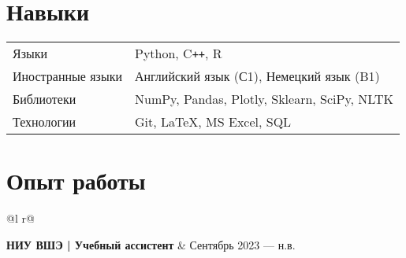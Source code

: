 \documentclass[a4paper,10pt]{article}
\begin{document}
\section{Навыки}
\begin{tabularx}{\linewidth}{@{}l X@{}}
Языки &  \normalsize{Python, C\texttt{++}, R}\\
Иностранные языки  &  \normalsize{Английский язык (С1), Немецкий язык (B1)}\\  
Библиотеки & \normalsize{NumPy, Pandas, Plotly, Sklearn, SciPy, NLTK}\\
Технологии & \normalsize{Git, \LaTeX, MS Excel, SQL}\\
\end{tabularx}



\section{Опыт работы}

\begin{tabularx}{\linewidth}{ @{}l r@{} }

\textbf{НИУ ВШЭ | Учебный ассистент} & \hfill Сентябрь 2023 –– н.в. \\ [1.75pt]
  \\
\end{tabularx}

\end{document}
